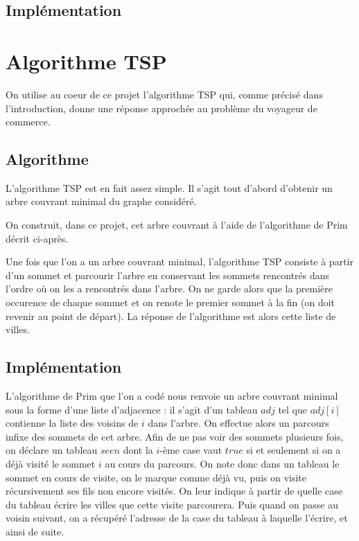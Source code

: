 \documentclass{article}
\begin{document}
\subsection{Implémentation}

\section{Algorithme TSP}
On utilise au coeur de ce projet l'algorithme TSP qui, comme précisé dans l'introduction, donne une réponse approchée au problème du voyageur de commerce.

\subsection{Algorithme}
L'algorithme TSP est en fait assez simple. Il s'agit tout d'abord d'obtenir un arbre couvrant minimal du graphe considéré.


On construit, dans ce projet, cet arbre couvrant à l'aide de l'algorithme de Prim décrit ci-après.

Une fois que l'on a un arbre couvrant minimal, l'algorithme TSP consiste à partir d'un sommet et parcourir l'arbre en conservant les sommets rencontrés dans l'ordre où 
on les a rencontrés dans l'arbre. On ne garde alors que la première occurence de chaque sommet et on renote le premier sommet à la fin (on doit revenir au point de 
départ). La réponse de l'algorithme est alors cette liste de villes.

\subsection{Implémentation}
L'algorithme de Prim que l'on a codé nous renvoie un arbre couvrant minimal sous la forme d'une liste d'adjacence : il s'agit d'un tableau $adj$ tel que
$adj[i]$ contienne la liste des voisins de $i$ dans l'arbre.
On effectue alors un parcours infixe
des sommets de cet arbre. Afin de ne pas voir des sommets plusieurs fois, on déclare un tableau $seen$ dont la $i$-ème case vaut $true$ si et seulement si on a déjà
visité le sommet $i$ au cours du parcours. On note donc dans un tableau le sommet en cours de visite, on le marque comme déjà vu, puis on visite récursivement ses 
fils non encore visités. On leur indique à partir de quelle case du tableau écrire les villes que cette visite parcourera. Puis quand on passe au voisin suivant, on a
récupéré l'adresse de la case du tableau à laquelle l'écrire, et ainsi de suite.
\end{document}
